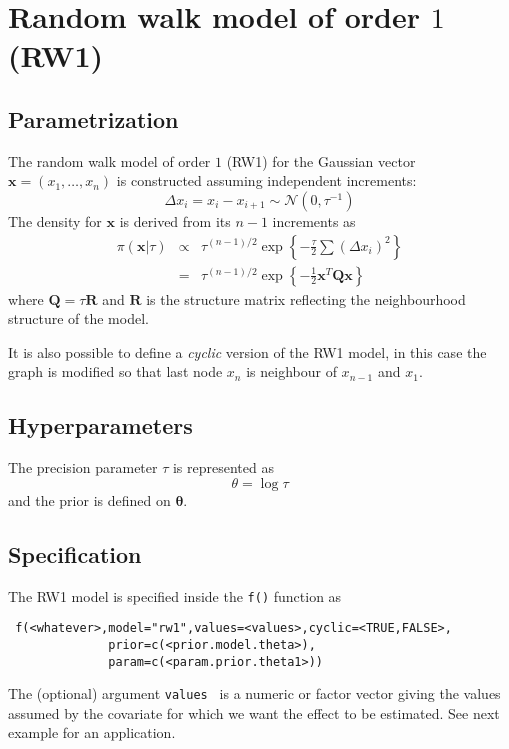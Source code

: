 \documentclass[a4paper,11pt]{article}
\begin{document}
\section*{Random walk model of order $1$ (RW1)}

\subsection*{Parametrization}

The random walk model of order $1$ (RW1) for the Gaussian vector $\mathbf{x}=(x_1,\dots,x_n)$ is constructed assuming independent increments:
\[
\Delta x_i = x_i-x_{i+1}\sim\mathcal{N}(0,\tau^{-1})
\]
The density for $\mathbf{x}$ is derived from its $n-1$ increments as
\begin{eqnarray}
\pi(\mathbf{x}|\tau) &\propto& \tau^{(n-1)/2} \exp\left\{-\frac{\tau}{2}\sum (\Delta x_i)^2\right\}\\
& = &\tau^{(n-1)/2}\exp\left\{-\frac{1}{2}\mathbf{x}^T\mathbf{Q}\mathbf{x} \right\}
\end{eqnarray}
where $\mathbf{Q}=\tau\mathbf{R}$ and $\mathbf{R}$ is the structure matrix reflecting the neighbourhood structure of the model.

It is also possible to define a {\it cyclic} version of the RW1 model, in this case the graph is modified so that last node $x_n$ 
is neighbour of $x_{n-1}$ and $x_1$. 
\subsection*{Hyperparameters}

The precision parameter $\tau$ is represented as
\begin{displaymath}
    \theta =\log \tau
\end{displaymath}
and the prior is defined on $\mathbf{\theta}$. 

\subsection*{Specification}

The RW1 model is specified inside the {\tt f()} function as
\begin{verbatim}
 f(<whatever>,model="rw1",values=<values>,cyclic=<TRUE,FALSE>,
              prior=c(<prior.model.theta>),
              param=c(<param.prior.theta1>))
\end{verbatim}
The (optional) argument {\tt values } is a numeric or factor vector giving the values assumed by the covariate for
 which we want the effect to be estimated. See next example for an application. 
 
\end{document}

